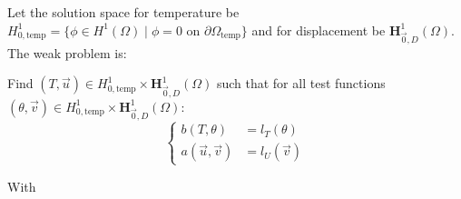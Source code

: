 \documentclass[a4paper,12pt,twoside]{report}
\begin{document}
Let the solution space for temperature be $H^1_{0,\text{temp}} = \{ \phi \in H^1(\Omega) \mid \phi = 0 \text{ on } \partial\Omega_{\text{temp}} \}$ and for displacement be $\boldsymbol{H}^1_{\vec 0,D}(\Omega)$. The weak problem is:
\begin{tcolorbox}
Find $(T, \vec u) \in H^1_{0,\text{temp}} \times \boldsymbol{H}^1_{\vec 0,D}(\Omega)$ such that for all test functions $(\theta, \vec v) \in H^1_{0,\text{temp}} \times \boldsymbol{H}^1_{\vec 0,D}(\Omega)$:
\begin{equation}
	\left\{
	\begin{aligned}
		b(T, \theta) &= l_T(\theta) \\
		a(\vec u, \vec v) &= l_U(\vec v)
	\end{aligned}
	\right.
\end{equation}
\label{eq:weak-thermoelasticity}
\end{tcolorbox}
With 
\end{document}
